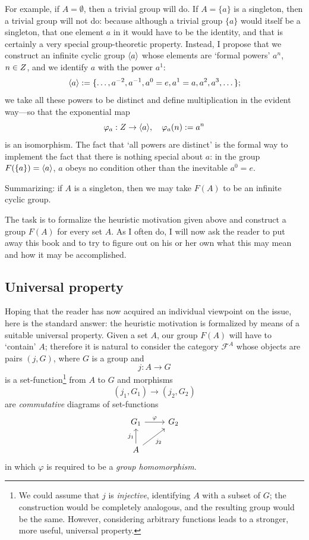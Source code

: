 For example, if $A = \emptyset$, then a trivial group will do. If
$A = \{a\}$ is a singleton, then a trivial group will not do: because
although a trivial group $\{a\}$ would itself be a singleton, that one
element $a$ in it would have to be the identity, and that is certainly
a very special group-theoretic property. Instead, I propose that we
construct an infinite cyclic group $\langle a\rangle$ whose elements are
`formal powers' $a^n$, $n \in Z$, and we identify $a$ with the power
$a^1$:
\[
  \langle a\rangle := \{\dots, a^{-2}, a^{-1}, a^0 = e, a^1 = a, a^2, a^3,
  \dots\};
\]
we take all these powers to be distinct and define multiplication in
the evident way---so that the exponential map
\[
  \varphi_a : Z \to \langle a\rangle, \quad \varphi_a(n) := a^n
\]
is an isomorphism. The fact that `all powers are distinct' is the
formal way to implement the fact that there is nothing special about
$a$: in the group $F(\{a\}) = \langle a\rangle$, $a$ obeys no condition
other than the inevitable $a^0 = e$.

Summarizing: if $A$ is a singleton, then we may take $F(A)$ to be an
infinite cyclic group.

The task is to formalize the heuristic motivation given above and
construct a group $F(A)$ for every set $A$. As I often do, I will now
ask the reader to put away this book and to try to figure out on his
or her own what this may mean and how it may be accomplished.

\subsection{Universal property}
\label{subsec:groups:universal-property}
Hoping that the reader has now acquired an individual viewpoint on the
issue, here is the standard answer: the heuristic motivation is
formalized by means of a suitable universal property. Given a set $A$,
our group $F(A)$ will have to `contain' $A$; therefore it is natural
to consider the category $\mathscr{F}^A$ whose objects are pairs
$(j, G)$, where $G$ is a group and
\[
  j : A \to G
\]
is a set-function\footnote{We could assume that $j$ is
  \emph{injective}, identifying $A$ with a subset of $G$; the
  construction would be completely analogous, and the resulting group
  would be the same. However, considering arbitrary functions leads to
  a stronger, more useful, universal property.}  from $A$ to $G$ and
morphisms
\[
  (j_1, G_1) \to (j_2, G_2)
\]
are \emph{commutative} diagrams of set-functions
\[
  \begin{tikzcd}
    G_1 \arrow[r, "\varphi"] & G_2 \\
    A \arrow[u, "j_1"] \arrow[ur, "j_2"'] &
  \end{tikzcd}
\]
in which $\varphi$ is required to be a \emph{group homomorphism}.

